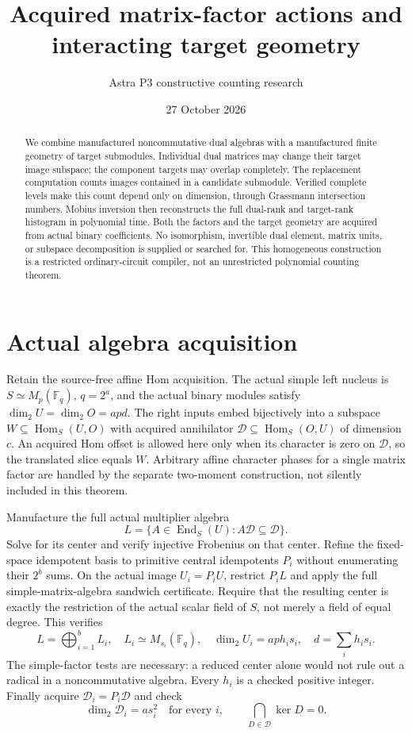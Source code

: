 \documentclass[11pt]{article}
\title{Acquired matrix-factor actions and interacting target geometry}
\author{Astra P3 constructive counting research}\date{27 October 2026}
\newcommand{\F}{\mathbb F}\newcommand{\End}{\operatorname{End}}
\newcommand{\Hom}{\operatorname{Hom}}\newcommand{\rank}{\operatorname{rank}}
\begin{document}
\maketitle
\begin{abstract}
We combine manufactured noncommutative dual algebras with a manufactured
finite geometry of target submodules. Individual dual matrices may change
their target image subspace; the component targets may overlap completely.
The replacement computation counts images contained in a candidate submodule.
Verified complete levels make this count depend only on dimension, through
Grassmann intersection numbers. Mobius inversion then reconstructs the full
dual-rank and target-rank histogram in polynomial time. Both the factors and
the target geometry are acquired from actual binary coefficients. No
isomorphism, invertible dual element, matrix units, or subspace decomposition
is supplied or searched for. This homogeneous construction is a restricted
ordinary-circuit compiler, not an unrestricted polynomial counting theorem.
\end{abstract}

\section{Actual algebra acquisition}
Retain the source-free affine Hom acquisition. The actual simple left nucleus
is $S\simeq M_p(\F_q)$, $q=2^a$, and the actual binary modules satisfy
$\dim_2U=\dim_2O=apd$. The right inputs embed bijectively into a subspace
$W\subseteq\Hom_S(U,O)$ with acquired annihilator
$\mathcal D\subseteq\Hom_S(O,U)$ of dimension $c$.
An acquired Hom offset is allowed here only when its character is zero on
$\mathcal D$, so the translated slice equals $W$. Arbitrary affine character
phases for a single matrix factor are handled by the separate two-moment
construction, not silently included in this theorem.

Manufacture the full actual multiplier algebra
\[
 L=\{A\in\End_S(U):A\mathcal D\subseteq\mathcal D\}.
\]
Solve for its center and verify injective Frobenius on that center. Refine the
fixed-space idempotent basis to primitive central idempotents $P_i$ without
enumerating their $2^b$ sums. On the actual image $U_i=P_iU$, restrict
$P_iL$ and apply the full simple-matrix-algebra sandwich certificate.
Require that the resulting center is exactly the restriction of the actual
scalar field of $S$, not merely a field of equal degree. This verifies
\[
 L=\bigoplus_{i=1}^bL_i,\quad L_i\simeq M_{s_i}(\F_q),
 \quad \dim_2U_i=ap h_i s_i,\quad d=\sum_i h_i s_i.
\]
The simple-factor tests are necessary: a reduced center alone would not rule
out a radical in a noncommutative algebra. Every $h_i$ is a checked positive
integer. Finally acquire $\mathcal D_i=P_i\mathcal D$ and check
\begin{equation}\label{eq:regular}
 \dim_2\mathcal D_i=a s_i^2\quad\text{for every }i,
 \qquad\bigcap_{D\in\mathcal D}\ker D=0.
\end{equation}
\end{document}
